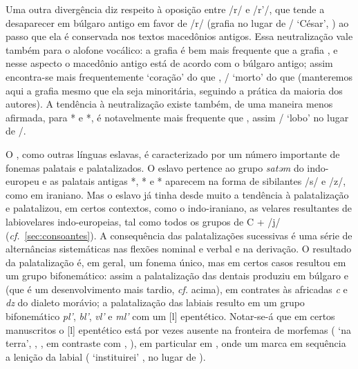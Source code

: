 Uma outra divergência diz respeito à oposição entre /r/ e /r'/, que tende a
desaparecer em búlgaro antigo em favor de /r/ (grafia
 no lugar de \slash{}
`César', ) ao passo que ela é conservada nos textos macedônios antigos.
Essa neutralização vale também para o alofone vocálico:
a grafia  é bem mais frequente que a grafia
, e nesse aspecto o macedônio antigo está de acordo com o
búlgaro antigo; assim encontra-se mais frequentemente
 `coração' do que
, \slash{} `morto' do que
 (manteremos aqui a grafia
 mesmo que ela seja minoritária, seguindo a prática da
maioria dos autores).
A tendência à neutralização existe também, de uma maneira menos afirmada, para
* e *,  é notavelmente mais
frequente que , assim \slash{}
`lobo' no lugar de \slash{}.

O , como outras línguas eslavas, é caracterizado por um número
importante de fonemas palatais e palatalizados.
O eslavo pertence ao grupo \emph{satəm} do indo-europeu e as palatais antigas
*, * e * aparecem na forma de sibilantes
/s/ e /z/, como em iraniano.
Mas o eslavo já tinha desde muito a tendência à palatalização e palatalizou, em
certos contextos, como o indo-iraniano, as velares resultantes de labiovelares
indo-europeias, tal como todos os grupos de C + /j/
(\emph{cf.}~\ref{sec:consoantes}).
A consequência das palatalizações sucessivas é uma série de alternâncias
sistemáticas nas flexões nominal e verbal e na derivação.
O resultado da palatalização é, em geral, um fonema único, mas em certos casos
resultou em um grupo bifonemático: assim a palatalização das dentais produziu em
búlgaro  e  (que é um desenvolvimento mais tardio,
\emph{cf.} acima), em contrates às africadas \emph{c} e \emph{dz} do dialeto
morávio; a palatalização das labiais resulto em um grupo bifonemático
\emph{pl'}, \emph{bl'}, \emph{vl'} e \emph{ml'} com um [l] epentético.
Notar-se-á que em certos manuscritos o [l] epentético está por vezes ausente na
fronteira de morfemas (  `na terra',
,
, em contraste com , ), em particular em
, onde um \grafema{\jeru{}} marca em sequência a lenição da
labial (  `instituirei'
, no lugar de ).

